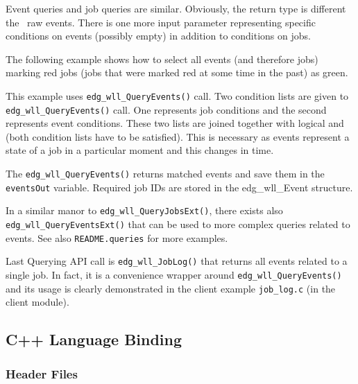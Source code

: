 Event queries and job queries are similar. Obviously, the return type is
different \Dash the \LB\ raw events. There is one more input parameter
representing specific conditions on events (possibly empty) in addition to
conditions on jobs.

The following example shows how to select all events (and therefore jobs)
marking red jobs (jobs that were marked red at some time in the past) as green.





This example uses \texttt{edg\_wll\_QueryEvents()} call. Two condition lists are
given to \texttt{edg\_wll\_QueryEvents()} call. One represents job conditions and
the second represents event conditions. These two lists are joined together with
logical and (both condition lists have to be satisfied). This is necessary as
events represent a state of a job in a particular moment and this changes in time.



The \texttt{edg\_wll\_QueryEvents()} returns matched events and save them in the
\texttt{eventsOut} variable. Required job IDs are stored in the edg\_wll\_Event
structure.



In a similar manor to \texttt{edg\_wll\_QueryJobsExt()}, there exists also \texttt{edg\_wll\_QueryEventsExt()} 
that can be used to more complex queries related to events. See also \texttt{README.queries} for more examples.


Last \LB Querying API call is \texttt{edg\_wll\_JobLog()} that returns all events related to a single job.
In fact, it is a convenience wrapper around \texttt{edg\_wll\_QueryEvents()} and its usage is clearly
demonstrated in the client example \texttt{job\_log.c} (in the client module).



\subsection{C++ Language Binding}
\subsubsection{Header Files}
